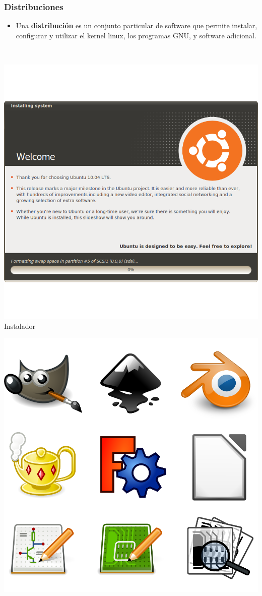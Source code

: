 \documentclass[hyperref={colorlinks}]{beamer}
\begin{document}
\begin{frame}
    \frametitle{Distribuciones}
    \begin{itemize}
    \item Una \textbf{distribuci\'on} es un conjunto particular de software que permite instalar, configurar y utilizar el kernel linux, los programas GNU, y software adicional.
    \end{itemize}
    
    \ \\
    
	\begin{minipage}[b][.30\textheight][t]{.24\textwidth}
	    \includegraphics[width=.7\textwidth]{figs/ubiquity.png}\\
	    \centering Instalador
    \end{minipage}
    \begin{minipage}[b][.30\textheight][t]{.24\textwidth}
	    \includegraphics[width=.7\textwidth]{figs/oss.png}\\

\end{minipage}
\end{frame}
\end{document}
